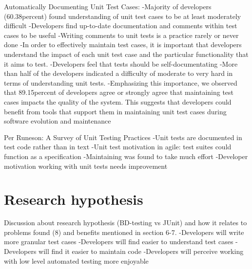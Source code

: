     Automatically Documenting Unit Test Cases:\newline
    -Majority of developers (60.38percent) found understanding of unit test cases to be at least moderately difficult\newline
    -Developers find up-to-date documentation and comments within test cases to be useful\newline
    -Writing comments to unit tests is a practice rarely or never done\newline
    -In order to effectively maintain test cases, it is important that developers understand the impact of each unit
     test case and the particular functionality that it aims to test.\newline
    -Developers feel that tests should be self-documentating\newline
    -More than half of the developers indicated a difficulty of moderate to very hard in terms of understanding unit tests.\newline
    -Emphasizing this importance, we observed that 89.15percent of developers agree or strongly agree that maintaining test cases
      impacts the quality of the system. This suggests that developers could benefit from tools that support them in maintaining unit test
       cases during software evolution and maintenance\newline\newline

   Per Runeson: A Survey of Unit Testing Practices\newline
   -Unit tests are documented in test code rather than in text\newline
   -Unit test motivation in agile: test suites could function as a specification\newline
   -Maintaining was found to take much effort\newline
   -Developer motivation working with unit tests needs improvement\newline
\section{Research hypothesis} %
    Discussion about research hypothesis (BD-testing vs JUnit) and how it relates to problems found (8) and benefits mentioned in section 6-7.\newline
    -Developers will write more granular test cases\newline
    -Developers will find easier to understand test cases\newline
    -Developers will find it easier to maintain code\newline
    -Developers will perceive working with low level automated testing more enjoyable\newline
